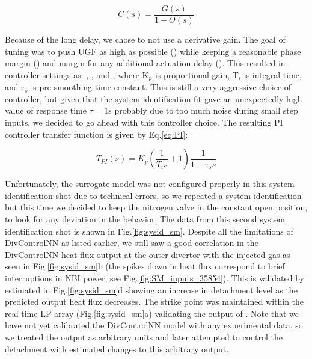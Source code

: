 \begin{equation}
 C(s) = \frac{G(s)}{1 + O(s)}
\label{eq:cltf}
\end{equation}



Because of the long delay, we chose to not use a derivative gain.
The goal of tuning was to push \ac{UGF} as high as possible (\AfracUGF) while keeping a reasonable phase margin (\AfracPhaseMargin) and margin for any additional actuation delay (\AfracDelayMargin).
This resulted in controller settings as: \AfracKp, \AfracTi, and \Afracstau, where K$_p$ is proportional gain, T$_i$ is integral time, and $\tau_s$ is pre-smoothing time constant.
This is still a very aggressive choice of controller, but given that the system identification fit gave an unexpectedly high value of response time $\tau=1$s probably due to too much noise during small step inputs, we decided to go ahead with this controller choice.
The resulting PI controller transfer function is given by Eq.\ref{eq:PI}:

\begin{equation}
 T_{PI}(s) = K_p \left( \frac{1}{T_i s} + 1\right) \frac{1}{1 + \tau_s s}
\label{eq:PI}
\end{equation}

Unfortunately, the surrogate model was not configured properly in this system identification shot due to technical errors, so we repeated a system identification but this time we decided to keep the nitrogen valve in the constant open position, to look for any deviation in the behavior.
The data from this second system identification shot is shown in Fig.\ref{fig:sysid_sm}.
Despite all the limitations of DivControlNN as listed earlier, we still saw a good correlation in the DivControlNN heat flux output at the outer divertor with the injected gas as seen in Fig.\ref{fig:sysid_sm}b (the spikes down in heat flux correspond to brief interruptions in NBI power; see Fig.\ref{fig:SM_inputs_35854}).
This is validated by estimated \Afrac in Fig.\ref{fig:sysid_sm}d showing an increase in detachment level as the predicted output heat flux decreases.
The strike point was maintained within the real-time \ac{LP}  array (Fig.\ref{fig:sysid_sm}a) validating the output of \Afrac{}.
Note that we have not yet calibrated the DivControlNN model with any experimental data, so we treated the output as arbitrary units and later attempted to control the detachment with estimated changes to this arbitrary output.

